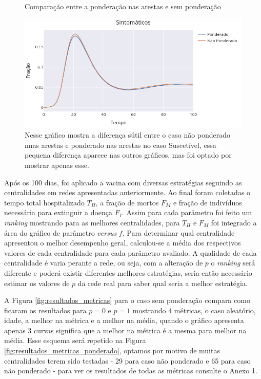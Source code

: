 \begin{figure}[H]
    \centering
    \captionsetup{font=normalsize,skip=0.8pt,singlelinecheck=on,labelsep=endash}
    \caption{Comparação entre a ponderação nas arestas e sem ponderação}
    \includegraphics[scale= 0.5]{figuras/compara_ponderado_nponderado.png}
    \captionsetup{font=small,justification=justified}
    
    \caption*{Nesse gráfico mostra a diferença sútil entre o caso não ponderado nnas arestas e ponderado nas arestas no caso Suscetível, essa pequena diferença aparece nas outros gráficos, mas foi optado por mostrar apenas esse.}
    \label{fig:compara_ponderado_nponderado}
\end{figure}

Após os 100 dias, foi aplicado a vacina com diversas estratégias seguindo as centralidades em redes apresentadas anteriormente. Ao final foram coletadas o tempo total hospitalizado $T_H$, a fração de mortos $F_M$ e fração de indivíduos necessária para extinguir a doença $F_I$. Assim para cada parâmetro foi feito um \textit{ranking} mostrando para as melhores centralidades, para $T_H$ e $F_M$ foi integrado a área do gráfico de parâmetro \textit{versus} $f$. Para determinar qual centralidade apresentou o melhor desempenho geral, calculou-se a média dos respectivos valores de cada centralidade para cada parâmetro avaliado. A qualidade de cada centralidade é varia perante a rede, ou seja, com a alteração de $p$ o \textit{ranking} será diferente e poderá existir diferentes melhores estratégias, seria então necessário estimar os valores de $p$ da rede real para saber qual seria a melhor estratégia. 

A Figura \ref{fig:resultados_metricas} para o caso sem ponderação compara como ficaram os resultados para $p = 0$ e $p = 1$ mostrando 4 métricas, o caso aleatório, idade, a melhor na métrica e a melhor na média, quando o gráfico apresenta apenas 3 curvas significa que a melhor na métrica é a mesma para melhor na média. Esse esquema será repetido na Figura \ref{fig:resultados_metricas_ponderado}, optamos por motivo de muitas centralidades terem sido testadas - 29 para caso não ponderado e 65 para caso não ponderado - para ver os resultados de todas as métricas consulte o Anexo 1.

